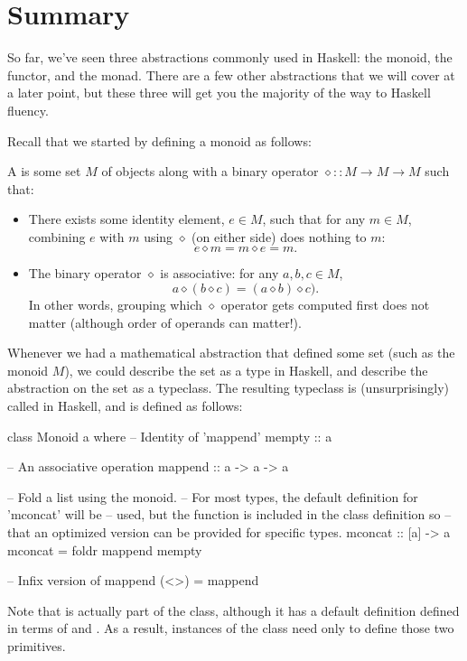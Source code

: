 \section{Summary}
\label{sec:abstractions-summary}
So far, we've seen three abstractions commonly used in Haskell: the monoid, the functor, and the
monad. There are a few other abstractions that we will cover at a later point, but these three will
get you the majority of the way to Haskell fluency.

Recall that we started by defining a monoid as follows: 
\begin{definition}
A  is some set $M$ of objects along with a binary operator $\diamond :: M \to M \to M$
such that:
\begin{itemize}
    \item There exists some identity element, $e \in M$, such that for any $m \in M$, combining $e$
        with $m$ using $\diamond$ (on either side) does nothing to $m$:
        \[e \diamond m = m \diamond e = m.\]
    \item The binary operator $\diamond$ is associative: for any $a, b, c \in M$,
        \[a \diamond (b \diamond c) = (a \diamond b) \diamond c).\]
        In other words, grouping which $\diamond$ operator gets computed first does not matter
        (although order of operands can matter!).
\end{itemize}
\end{definition}
Whenever we had a mathematical abstraction that defined some set (such as the monoid $M$), we could
describe the set as a type in Haskell, and describe the abstraction on the set as a typeclass.
The resulting typeclass is (unsurprisingly) called  in Haskell, and is defined as
follows:
\begin{haskell}
class Monoid a where
  -- Identity of 'mappend'
  mempty  :: a

  -- An associative operation
  mappend :: a -> a -> a

  -- Fold a list using the monoid.
  -- For most types, the default definition for 'mconcat' will be
  -- used, but the function is included in the class definition so
  -- that an optimized version can be provided for specific types.
  mconcat :: [a] -> a
  mconcat = foldr mappend mempty

-- Infix version of mappend
(<>) = mappend
\end{haskell}
Note that  is actually part of the class, although it has a default definition
defined in terms of  and . As a result, instances of the
 class need only to define those two primitives.

